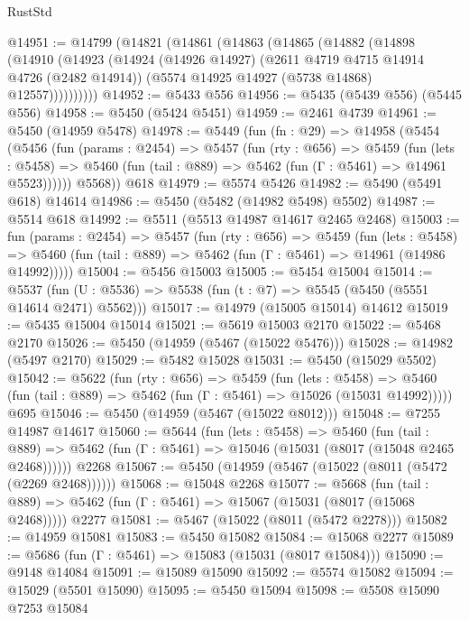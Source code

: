 \begin{lexlean}{RustStd}
\begin{coremodule}
@14951 := @14799
    (@14821
      (@14861
        (@14863
          (@14865
            (@14882
              (@14898
                (@14910
                  (@14923
                    (@14924
                      (@14926 @14927)
                      (@2611 @4719 @4715 @14914 @4726 (@2482 @14914))
                      (@5574 @14925 @14927 (@5738 @14868) @12557))))))))))
@14952 := @5433 @556
@14956 := @5435 (@5439 @556) (@5445 @556)
@14958 := @5450 (@5424 @5451)
@14959 := @2461 @4739
@14961 := @5450 (@14959 @5478)
@14978 := @5449
    (fun (fn : @29) =>
    @14958
      (@5454
        (@5456
          (fun (params : @2454) =>
          @5457
            (fun (rty : @656) =>
            @5459
              (fun (lets : @5458) =>
              @5460 (fun (tail : @889) => @5462 (fun (Γ : @5461) => @14961 @5523))))))
        @5568))
    @618
@14979 := @5574 @5426
@14982 := @5490 (@5491 @618) @14614
@14986 := @5450 (@5482 (@14982 @5498) @5502)
@14987 := @5514 @618
@14992 := @5511 (@5513 @14987 @14617 @2465 @2468)
@15003 := fun (params : @2454) =>
  @5457
    (fun (rty : @656) =>
    @5459
      (fun (lets : @5458) =>
      @5460 (fun (tail : @889) => @5462 (fun (Γ : @5461) => @14961 (@14986 @14992)))))
@15004 := @5456 @15003
@15005 := @5454 @15004
@15014 := @5537
    (fun (U : @5536) => @5538 (fun (t : @7) => @5545 (@5450 (@5551 @14614 @2471) @5562)))
@15017 := @14979 (@15005 @15014) @14612
@15019 := @5435 @15004 @15014
@15021 := @5619 @15003 @2170
@15022 := @5468 @2170
@15026 := @5450 (@14959 (@5467 (@15022 @5476)))
@15028 := @14982 (@5497 @2170)
@15029 := @5482 @15028
@15031 := @5450 (@15029 @5502)
@15042 := @5622
    (fun (rty : @656) =>
    @5459
      (fun (lets : @5458) =>
      @5460 (fun (tail : @889) => @5462 (fun (Γ : @5461) => @15026 (@15031 @14992)))))
    @695
@15046 := @5450 (@14959 (@5467 (@15022 @8012)))
@15048 := @7255 @14987 @14617
@15060 := @5644
    (fun (lets : @5458) =>
    @5460
      (fun (tail : @889) =>
      @5462 (fun (Γ : @5461) => @15046 (@15031 (@8017 (@15048 @2465 @2468))))))
    @2268
@15067 := @5450 (@14959 (@5467 (@15022 (@8011 (@5472 (@2269 @2468))))))
@15068 := @15048 @2268
@15077 := @5668
    (fun (tail : @889) => @5462 (fun (Γ : @5461) => @15067 (@15031 (@8017 (@15068 @2468)))))
    @2277
@15081 := @5467 (@15022 (@8011 (@5472 @2278)))
@15082 := @14959 @15081
@15083 := @5450 @15082
@15084 := @15068 @2277
@15089 := @5686 (fun (Γ : @5461) => @15083 (@15031 (@8017 @15084)))
@15090 := @9148 @14084
@15091 := @15089 @15090
@15092 := @5574 @15082
@15094 := @15029 (@5501 @15090)
@15095 := @5450 @15094
@15098 := @5508 @15090 @7253 @15084

\end{coremodule}
\end{lexlean}
